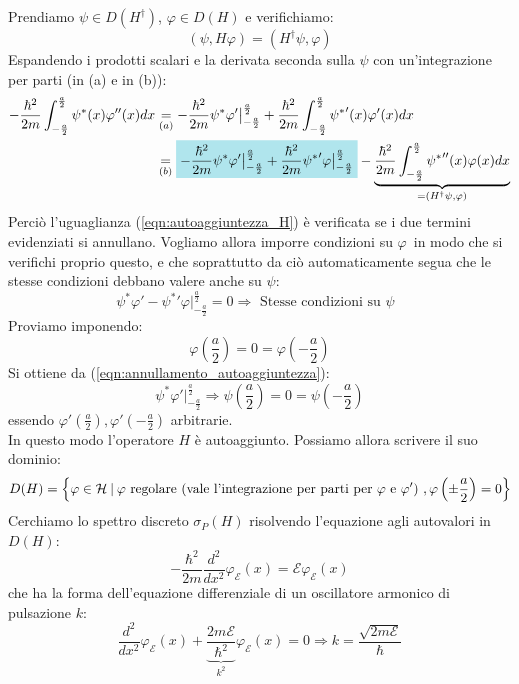 \documentclass[../../FisicaTeorica.tex]{subfiles}
\begin{document}
Prendiamo $\psi \in D(H^\dag)$, $\varphi \in D(H)$ e verifichiamo:
\begin{equation}
(\psi, H\varphi) = (H^\dag \psi,\varphi)
\label{eqn:autoaggiuntezza_H}
\end{equation}
Espandendo i prodotti scalari e  la derivata seconda sulla $\psi$ con un'integrazione per parti (in (a) e in (b)):
\begin{align*}
-\frac{\hbar^2}{2m}\int_{-\frac{a}{2}}^{\frac{a}{2}} \psi^*(x) \varphi''(x)dx &\underset{(a)}{=} -\frac{\hbar^2}{2m}\psi^*\varphi' \big|_{-\frac{a}{2}}^{\frac{a}{2}} + \frac{\hbar^2}{2m}\int_{-\frac{a}{2}}^{\frac{a}{2}}{\psi^*}'(x)\varphi'(x)dx\\
&\underset{(b)}{=} \hlc{SkyBlue}{-\frac{\hbar^2}{2m}\psi^*\varphi'\big|_{-\frac{a}{2}}^{\frac{a}{2}}+\frac{\hbar^2}{2m}{\psi^*}'\varphi\big|_{-\frac{a}{2}}^{\frac{a}{2}}} - \underbrace{\frac{\hbar^2}{2m}\int_{-\frac{a}{2}}^{\frac{a}{2}}{\psi^*}''(x)\varphi(x)dx}_{=(H^\dag \psi,\varphi)}
\end{align*}
Perciò l'uguaglianza (\ref{eqn:autoaggiuntezza_H}) è verificata se i due termini evidenziati si annullano. Vogliamo allora imporre condizioni su $\varphi$\ in modo che si verifichi proprio questo, e che soprattutto da ciò automaticamente segua che le stesse condizioni debbano valere anche su $\psi$:
\begin{equation}
\psi^*\varphi'-{\psi^*}'\varphi\big|_{-\frac{a}{2}}^{\frac{a}{2}}=0\Rightarrow \text{ Stesse condizioni su $\psi$ }
\label{eqn:annullamento_autoaggiuntezza}
\end{equation}
Proviamo imponendo:
\[
\varphi\left(\frac{a}{2}\right)=0=\varphi\left(-\frac{a}{2}\right)
\]
Si ottiene da (\ref{eqn:annullamento_autoaggiuntezza}):
\[
\psi^*\varphi'\big|_{-\frac{a}{2}}^{\frac{a}{2}} \Rightarrow \psi\left(\frac{a}{2}\right)=0=\psi\left(-\frac{a}{2}\right)
\]
essendo $\varphi'\left(\frac{a}{2}\right), \varphi'\left(-\frac{a}{2}\right)$ arbitrarie.\\
In questo modo l'operatore $H$ è autoaggiunto. Possiamo allora scrivere il suo dominio:
\[
D(H)= \left \{\varphi \in \mathcal{H}\>|\> \varphi \text{ regolare (vale l'integrazione per parti per $\varphi$ e $\varphi'$) }, \varphi\left(\pm \frac{a}{2}\right) =  0\right \}
\]
Cerchiamo lo spettro discreto $\sigma_P(H)$ risolvendo l'equazione agli autovalori in $D(H)$:
\[
-\frac{\hbar^2}{2m}\frac{d^2}{dx^2}\varphi_{\mathcal{E}}(x) = \mathcal{E}\varphi_{\mathcal{E}}(x)
\]
che ha la forma dell'equazione differenziale di un oscillatore armonico di pulsazione $k$:
\begin{equation}
\frac{d^2}{dx^2}\varphi_\mathcal{E}(x)+\underbrace{\frac{2m\mathcal{E}}{\hbar^2}}_{k^2}\varphi_\mathcal{E}(x)=0 \Rightarrow k = \frac{\sqrt{2m\mathcal{E}}}{\hbar}
\label{eqn:oscillatore_armonico}
\end{equation}
\end{document}
